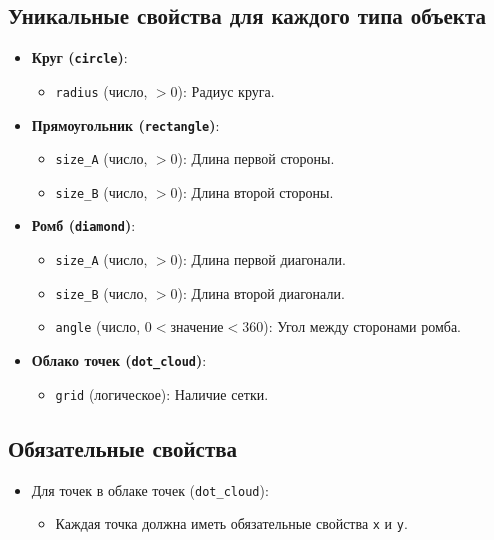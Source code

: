 \documentclass{article}
\begin{document}
\subsection{Уникальные свойства для каждого типа объекта}
\begin{itemize}
    \item \textbf{Круг (\texttt{circle})}:
    \begin{itemize}
        \item \texttt{radius} (число, $> 0$): Радиус круга.
    \end{itemize}
    \item \textbf{Прямоугольник (\texttt{rectangle})}:
    \begin{itemize}
        \item \texttt{size\_A} (число, $> 0$): Длина первой стороны.
        \item \texttt{size\_B} (число, $> 0$): Длина второй стороны.
    \end{itemize}
    \item \textbf{Ромб (\texttt{diamond})}:
    \begin{itemize}
        \item \texttt{size\_A} (число, $> 0$): Длина первой диагонали.
        \item \texttt{size\_B} (число, $>0$): Длина второй диагонали.
        \item \texttt{angle} (число, $0 < \text{значение} < 360$): Угол между сторонами ромба.
    \end{itemize}
    \item \textbf{Облако точек (\texttt{dot\_cloud})}:
    \begin{itemize}
        \item \texttt{grid} (логическое): Наличие сетки.
    \end{itemize}
\end{itemize}

\subsection{Обязательные свойства}
\begin{itemize}
    \item Для точек в облаке точек (\texttt{dot\_cloud}):
    \begin{itemize}
        \item Каждая точка должна иметь обязательные свойства \texttt{x} и \texttt{y}.
    \end{itemize}
\end{itemize}
\end{document}
